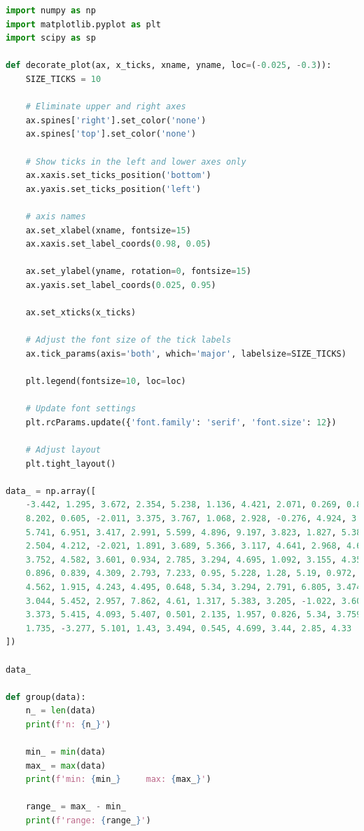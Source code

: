 \documentclass[a4paper, 14pt]{extarticle}
\begin{document}
\begin{center}
    \begin{lstlisting}[language=Python]
import numpy as np
import matplotlib.pyplot as plt
import scipy as sp

def decorate_plot(ax, x_ticks, xname, yname, loc=(-0.025, -0.3)):
    SIZE_TICKS = 10

    # Eliminate upper and right axes
    ax.spines['right'].set_color('none')
    ax.spines['top'].set_color('none')

    # Show ticks in the left and lower axes only
    ax.xaxis.set_ticks_position('bottom')
    ax.yaxis.set_ticks_position('left')

    # axis names
    ax.set_xlabel(xname, fontsize=15)
    ax.xaxis.set_label_coords(0.98, 0.05)

    ax.set_ylabel(yname, rotation=0, fontsize=15)
    ax.yaxis.set_label_coords(0.025, 0.95)

    ax.set_xticks(x_ticks)

    # Adjust the font size of the tick labels
    ax.tick_params(axis='both', which='major', labelsize=SIZE_TICKS)

    plt.legend(fontsize=10, loc=loc)

    # Update font settings
    plt.rcParams.update({'font.family': 'serif', 'font.size': 12})

    # Adjust layout
    plt.tight_layout()

data_ = np.array([
    -3.442, 1.295, 3.672, 2.354, 5.238, 1.136, 4.421, 2.071, 0.269, 0.894,
    8.202, 0.605, -2.011, 3.375, 3.767, 1.068, 2.928, -0.276, 4.924, 3.31,
    5.741, 6.951, 3.417, 2.991, 5.599, 4.896, 9.197, 3.823, 1.827, 5.389,
    2.504, 4.212, -2.021, 1.891, 3.689, 5.366, 3.117, 4.641, 2.968, 4.645,
    3.752, 4.582, 3.601, 0.934, 2.785, 3.294, 4.695, 1.092, 3.155, 4.352,
    0.896, 0.839, 4.309, 2.793, 7.233, 0.95, 5.228, 1.28, 5.19, 0.972,
    4.562, 1.915, 4.243, 4.495, 0.648, 5.34, 3.294, 2.791, 6.805, 3.474,
    3.044, 5.452, 2.957, 7.862, 4.61, 1.317, 5.383, 3.205, -1.022, 3.602,
    3.373, 5.415, 4.093, 5.407, 0.501, 2.135, 1.957, 0.826, 5.34, 3.759,
    1.735, -3.277, 5.101, 1.43, 3.494, 0.545, 4.699, 3.44, 2.85, 4.33
])

data_

def group(data):
    n_ = len(data)
    print(f'n: {n_}')

    min_ = min(data)
    max_ = max(data)
    print(f'min: {min_}     max: {max_}')

    range_ = max_ - min_
    print(f'range: {range_}')


\end{lstlisting}
\end{center}
\end{document}
